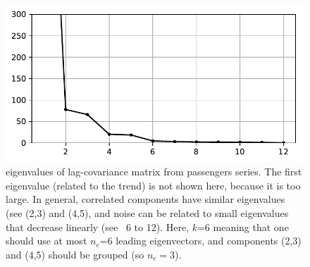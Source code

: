 \documentclass{article}
\begin{document}
\begin{figure}
  \centering
  \includegraphics[scale=0.5]{figures/fig0}
  \caption{eigenvalues of lag-covariance matrix from passengers series. The first eigenvalue (related to the trend) is not shown here, because it is too large. In general, correlated components have similar eigenvalues (see (2,3) and (4,5), and noise can be related to small eigenvalues that decrease linearly (see ~6 to 12). Here, $k$=6 meaning that one should use at most $n_e$=6 leading eigenvectors, and components (2,3) and (4,5) should be grouped (so $n_c=3$).}
  \label{fig:f0}
\end{figure}
\end{document}
